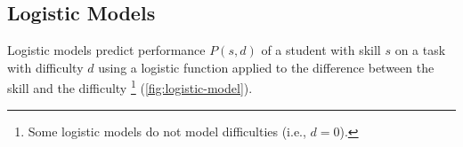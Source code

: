 %
%
%


\subsection{Logistic Models}  %
\label{sec:logistic-models}

Logistic models \cite{irt-visual-guide}  %
predict performance $P(s, d)$
of a student with skill $s$ on a task with difficulty $d$
using a logistic function applied to the difference between the skill and the difficulty%
\footnote{Some logistic models do not model difficulties (i.e., $d = 0$).}
(\cref{fig:logistic-model}).

